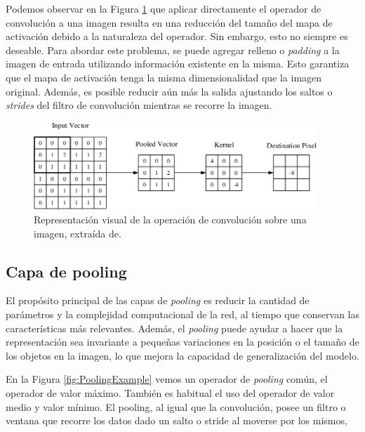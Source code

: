 Podemos observar en la Figura \ref{fig:ConvolutionalRepresentation} que aplicar directamente 
el operador de convolución a una imagen resulta en una reducción del tamaño del mapa 
de activación debido a la naturaleza del operador. 
Sin embargo, esto no siempre es deseable. 
Para abordar este problema, se puede agregar relleno o \emph{padding} a la imagen 
de entrada utilizando información existente en la misma. 
Esto garantiza que el mapa de activación tenga la misma dimensionalidad que 
la imagen original. Además, es posible reducir aún más la salida ajustando 
los saltos o \emph{strides} del filtro de convolución mientras se recorre la imagen.

\begin{figure}[htp]
  \begin{center}
    \includegraphics[width=0.95\textwidth]{imagenes/chapter2/ConvolutionalRepresentation.png}
  \end{center}
  \caption[Representación visual de la operación de convolución]{Representación visual de la operación de convolución sobre una imagen, extraída de\cite{ConvolutionalRepresentation}.
  }
  \label{fig:ConvolutionalRepresentation}
\end{figure}

\subsection{Capa de pooling} 
El propósito principal de las capas de \emph{pooling} es reducir la cantidad de parámetros 
y la complejidad computacional de la red, al tiempo que conservan las características 
más relevantes. Además, el \emph{pooling} puede ayudar a hacer que la representación sea 
invariante a pequeñas variaciones en la posición o el tamaño de los objetos en la 
imagen, lo que mejora la capacidad de generalización del modelo.

En la Figura \ref{fig:PoolingExample} vemos un operador de \emph{pooling} común,
el operador de valor máximo. También es habitual el uso del operador de valor medio y
valor mínimo.
El pooling, al igual que la convolución, posee un filtro o ventana que recorre
los datos dado un salto o stride al moverse por los mismos,

